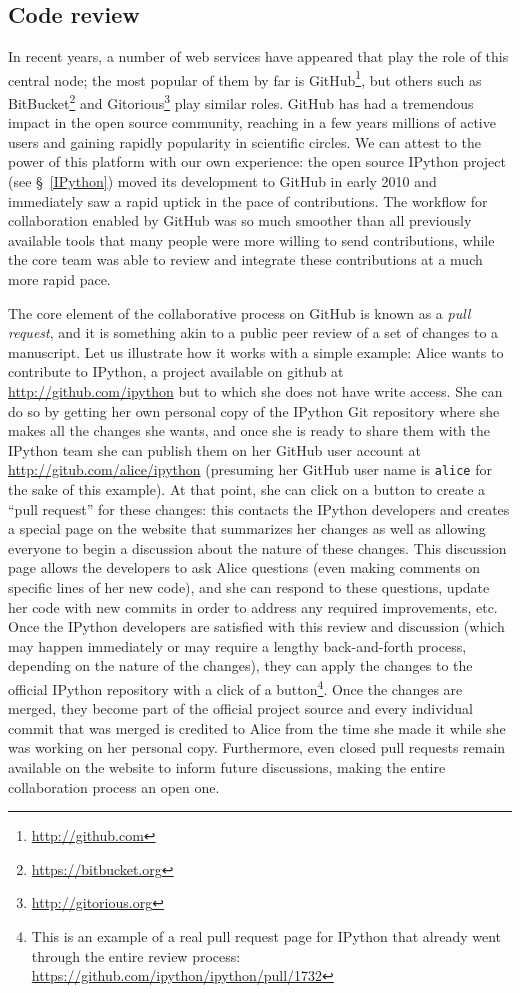 \documentclass[ChapterTOCs,krantz2]{krantz} %
\theoremstyle{definition}
\begin{document}
\subsection{Code review}

In recent years, a number of web services have appeared that play the role of
this central node; the most popular of them by far is
GitHub\footnote{\url{http://github.com}}, but others such as
BitBucket\footnote{\url{https://bitbucket.org}} and
Gitorious\footnote{\url{http://gitorious.org}} play similar roles.  GitHub has
had a tremendous impact in the open source community, reaching in a few years
millions of active users and gaining rapidly popularity in scientific circles.
We can attest to the power of this platform with our own experience: the open
source IPython project (see §~\ref{IPython}) moved its development to GitHub in
early 2010 and immediately saw a rapid uptick in the pace of contributions.
The workflow for collaboration enabled by GitHub was so much smoother than all
previously available tools that many people were more willing to send
contributions, while the core team was able to review and integrate these
contributions at a much more rapid pace.

The core element of the collaborative process on GitHub is known as a
\emph{pull request}, and it is something akin to a public peer review of a set
of changes to a manuscript.  Let us illustrate how it works with a simple
example: Alice wants to contribute to IPython, a project available on github at
\url{http://github.com/ipython} but to which she does not have write access.
She can do so by getting her own personal copy of the IPython Git repository
where she makes all the changes she wants, and once she is ready to share them
with the IPython team she can publish them on her GitHub user account at
\url{http://gitub.com/alice/ipython} (presuming her GitHub user name is
\texttt{alice} for the sake of this example).  At that point, she can click on
a button to create a ``pull request'' for these changes: this contacts the
IPython developers and creates a special page on the website that summarizes
her changes as well as allowing everyone to begin a discussion about the nature
of these changes.  This discussion page allows the developers to ask Alice
questions (even making comments on specific lines of her new code), and she can
respond to these questions, update her code with new commits in order to
address any required improvements, etc.  Once the IPython developers are
satisfied with this review and discussion (which may happen immediately or may
require a lengthy back-and-forth process, depending on the nature of the
changes), they can apply the changes to the official IPython repository with a
click of a button\footnote{This is an example of a real pull request page for
  IPython that already went through the entire review process:
  \url{https://github.com/ipython/ipython/pull/1732}}.  Once the changes are
merged, they become part of the official project source and every individual
commit that was merged is credited to Alice from the time she made it while she
was working on her personal copy.  Furthermore, even closed pull requests
remain available on the website to inform future discussions, making the entire
collaboration process an open one.
\end{document}
